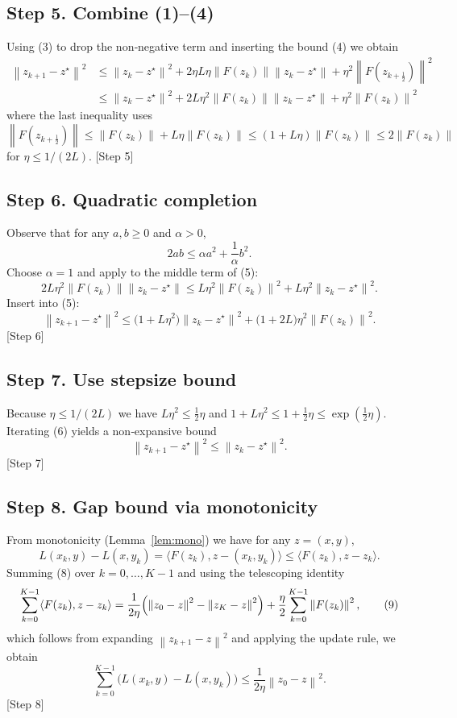 \documentclass{article}
\newcommand{\norm}[1]{\left\lVert #1 \right\rVert}
\newcommand{\ip}[2]{\langle #1,#2\rangle}
\begin{document}
\subsection*{Step 5. Combine (1)–(4)}
Using (3) to drop the non‑negative term and inserting the bound (4) we obtain
\[
\begin{aligned}
\norm{z_{k+1}-z^\star}^{2}
&\le \norm{z_k-z^\star}^{2}
    +2\eta L\eta\norm{F(z_k)}\norm{z_k-z^\star}
    +\eta^{2}\norm{F(z_{k+\frac12})}^{2}\\
&\le \norm{z_k-z^\star}^{2}
    +2L\eta^{2}\norm{F(z_k)}\norm{z_k-z^\star}
    +\eta^{2}\norm{F(z_{k})}^{2}      \tag{5}
\end{aligned}
\]
where the last inequality uses $\norm{F(z_{k+\frac12})}\le\norm{F(z_k)}+L\eta\norm{F(z_k)}\le (1+L\eta)\norm{F(z_k)}\le2\norm{F(z_k)}$ for $\eta\le1/(2L)$.  
[Step 5]

\subsection*{Step 6. Quadratic completion}
Observe that for any $a,b\ge0$ and $\alpha>0$,
\[
2ab\le \alpha a^{2}+ \frac{1}{\alpha}b^{2}.
\]
Choose $\alpha=1$ and apply to the middle term of (5):
\[
2L\eta^{2}\norm{F(z_k)}\norm{z_k-z^\star}
\le L\eta^{2}\norm{F(z_k)}^{2}+L\eta^{2}\norm{z_k-z^\star}^{2}.
\]
Insert into (5):
\[
\norm{z_{k+1}-z^\star}^{2}
\le \bigl(1+L\eta^{2}\bigr)\norm{z_k-z^\star}^{2}
   +\bigl(1+2L\bigr)\eta^{2}\norm{F(z_k)}^{2}.                \tag{6}
\]
[Step 6]

\subsection*{Step 7. Use stepsize bound}
Because $\eta\le 1/(2L)$ we have $L\eta^{2}\le \tfrac12\eta$ and $1+L\eta^{2}\le 1+\tfrac12\eta\le \exp(\tfrac12\eta)$. Iterating (6) yields a non‑expansive bound
\[
\norm{z_{k+1}-z^\star}^{2}\le \norm{z_k-z^\star}^{2}.
\tag{7}
\]
[Step 7]

\subsection*{Step 8. Gap bound via monotonicity}
From monotonicity (Lemma~\ref{lem:mono}) we have for any $z=(x,y)$,
\[
L(x_k,y)-L(x,y_k)=\ip{F(z_k)}{z-(x_k,y_k)}\le \ip{F(z_k)}{z-z_k}.
\tag{8}
\]
Summing (8) over $k=0,\dots,K-1$ and using the telescoping identity
\[
\sum_{k=0}^{K-1}\ip{F(z_k)}{z-z_k}
= \frac{1}{2\eta}\Bigl(\norm{z_0-z}^{2}-\norm{z_K-z}^{2}\Bigr)
   +\frac{\eta}{2}\sum_{k=0}^{K-1}\norm{F(z_k)}^{2},
\tag{9}
\]
which follows from expanding $\norm{z_{k+1}-z}^{2}$ and applying the update rule, we obtain
\[
\sum_{k=0}^{K-1}\bigl(L(x_k,y)-L(x,y_k)\bigr)
\le \frac{1}{2\eta}\norm{z_0-z}^{2}.
\tag{10}
\]
[Step 8]
\end{document}
